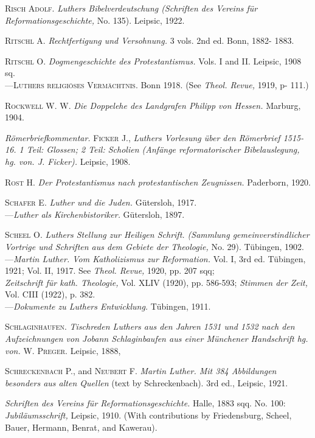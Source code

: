 \textsc{Risch Adolf.} \textit{Luthers Bibelverdeutschung (Schriften des Vereins für Reformationsgeschichte,}
No. 135). Leipsic, 1922.

\textsc{Ritschl A.} \textit{Rechtfertigung und Versohnung.} 3 vols. 2nd ed. Bonn, 1882-
1883.

\textsc{Ritschl O.} \textit{Dogmengeschichte des Protestantismus.} Vols. I and II. Leipsic,
1908 sq. \\
---\textsc{Luthers religiöses Vermächtnis.} Bonn 1918. (See \textit{Theol. Revue,} 1919, p-
111.)

\textsc{Rockwell W. W.} \textit{Die Doppelehe des Landgrafen Philipp von Hessen.} Marburg,
1904.

\textit{Römerbriefkommentar.} \textsc{Ficker J.}, \textit{Luthers Vorlesung über den Römerbrief
1515-16. 1 Teil: Glossen; 2 Teil: Scholien (Anfänge reformatorischer
Bibelauslegung, hg. von. J. Ficker).} Leipsic, 1908.

\textsc{Rost H.} \textit{Der Protestantismus nach protestantischen Zeugnissen.} Paderborn,
1920.

\textsc{Schafer E.} \textit{Luther und die Juden.} Gütersloh, 1917. \\
---\textit{Luther als Kirchenbistoriker.} Gütersloh, 1897.

\textsc{Scheel O.} \textit{Luthers Stellung zur Heiligen Schrift. (Sammlung gemeinverstindlicher Vortrige und Schriften aus dem Gebiete der Theologie,} No.
29). Tübingen, 1902. \\
---\textit{Martin Luther. Vom Katholizismus zur Reformation.} Vol. I, 3rd ed.
Tübingen, 1921; Vol. II, 1917. See \textit{Theol. Revue,} 1920, pp. 207 sqq; \\
\textit{Zeitschrift für kath. Theologie,} Vol. XLIV (1920), pp. 586-593; \textit{Stimmen
der Zeit,} Vol. CIII (1922), p. 382. \\
---\textit{Dokumente zu Luthers Entwicklung.} Tübingen, 1911.

\textsc{Schlaginhaufen.} \textit{Tischreden Luthers aus den Jahren 1531 und 1532 nach
den Aufzeichnungen von Jobann Schlaginbaufen aus einer Münchener
Handschrift hg. von.} \textsc{W. Preger.} Leipsic, 1888,

\textsc{Schreckenbach P.}, and \textsc{Neubert F.} \textit{Martin Luther. Mit 384 Abbildungen
besonders aus alten Quellen} (text by Schreckenbach). 3rd ed., Leipsic,
1921.

\textit{Schriften des Vereins für Reformationsgeschichte.} Halle, 1883 sqq. No. 100:
\textit{Jubiläumsschrift,} Leipsic, 1910. (With contributions by Friedensburg,
Scheel, Bauer, Hermann, Benrat, and Kawerau).

